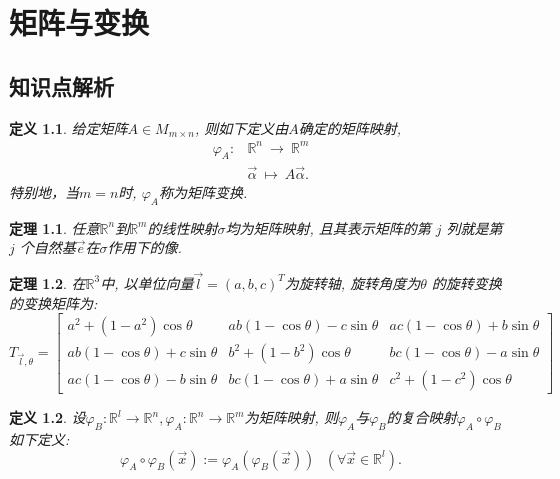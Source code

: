 \documentclass[a4paper]{book}
\newtheorem{Def}{定义}[chapter]
\newtheorem{thm}{定理}[chapter]
\begin{document}

\chapter{矩阵与变换}

\section{知识点解析}
\begin{Def}
给定矩阵$A\in M_{m\times n}$, 则如下定义由$A$确定的矩阵映射,
\begin{displaymath}\begin{aligned}
\varphi_A: & \mathbb{R}^n\ \rightarrow\ \mathbb{R}^m\\
& \vec{\alpha}\ \mapsto\ A\vec{\alpha}.\end{aligned}\end{displaymath}
特别地，当$m=n$时, $\varphi_A$称为矩阵变换.
\end{Def}

\begin{thm}
任意$\mathbb{R}^n$到$ \mathbb{R}^m$的线性映射$\sigma$均为矩阵映射, 且其表示矩阵的第 $j$ 列就是第 $j$ 个自然基$\vec{e}$在$\sigma$作用下的像.

\end{thm}

\begin{thm}
在$\mathbb{R}^3$中, 以单位向量$\vec{l} =(a,b,c)^T$为旋转轴, 旋转角度为$\theta$ 的旋转变换的变换矩阵为:
\begin{displaymath}
T_{\vec{l},\theta}=\begin{bmatrix} a^2+(1-a^2)\cos\theta & ab(1-\cos\theta)-c\sin\theta & ac(1-\cos\theta)+b\sin\theta\\
ab(1-\cos\theta)+c\sin\theta & b^2+(1-b^2)\cos\theta & bc(1-\cos\theta)-a\sin\theta  \\
ac(1-\cos\theta)-b\sin\theta& bc(1-\cos\theta)+a\sin\theta & c^2+(1-c^2)\cos\theta\end{bmatrix}\end{displaymath}
\end{thm}


\begin{Def}
设$\varphi_B:\mathbb{R}^l \rightarrow \mathbb{R}^n, \varphi_A:\mathbb{R}^n \rightarrow \mathbb{R}^m$为矩阵映射, 则$\varphi_A$与$\varphi_B$的复合映射$\varphi_A\circ \varphi_B$如下定义:
\begin{displaymath}
 \varphi_A\circ \varphi_B(\vec{x}):=\varphi_A( \varphi_B(\vec{x}))\ \ \ (\forall \vec{x}\in \mathbb{R}^l).\end{displaymath}
\end{Def}
\end{document}
